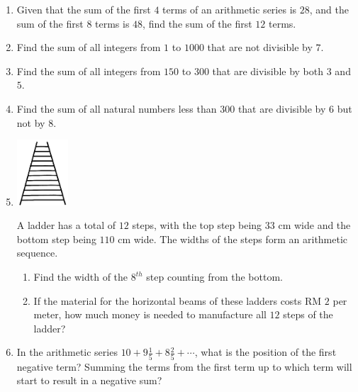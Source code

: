 \documentclass{report}
\begin{document}
        \vspace{-1em}
        \begin{enumerate}
            \item Given that the sum of the first $4$ terms of an arithmetic series is $28$, and the sum of the first $8$ terms is $48$, find the sum of the first $12$ terms.
            
            \item Find the sum of all integers from $1$ to $1000$ that are not divisible by $7$.
            
            \item Find the sum of all integers from $150$ to $300$ that are divisible by both $3$ and $5$.
            
            \item Find the sum of all natural numbers less than 300 that are divisible by $6$ but not by $8$.
            
            \item \parbox[t]{\textwidth}{
                \begin{center}
                    \includegraphics[width=0.15\textwidth]{assets/13-13.jpg}
                \end{center}
            }
            A ladder has a total of $12$ steps, with the top step being $33$ cm wide and the bottom step being $110$ cm wide. The widths of the steps form an arithmetic sequence.
            
            \begin{enumerate}
                \item Find the width of the $8^{th}$ step counting from the bottom.
            
                \item If the material for the horizontal beams of these ladders costs RM $2$ per meter, how much money is needed to manufacture all $12$ steps of the ladder?
            \end{enumerate}
            
            \item In the arithmetic series \(10+9\frac{1}{5}+8\frac{2}{5}+\cdots\), what is the position of the first negative term? Summing the terms from the first term up to which term will start to result in a negative sum?
            

\end{enumerate}
\end{document}
